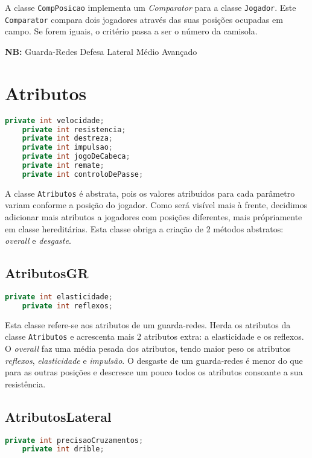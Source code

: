 \documentclass[a4paper]{report}
\begin{document}
    A classe \texttt{CompPosicao} implementa um \textit{Comparator} para a classe \texttt{Jogador}.
    Este \texttt{Comparator} compara dois jogadores através das suas posições ocupadas em campo. Se forem iguais, o critério passa a ser o número da camisola. \par 
    \textbf{NB:} Guarda-Redes \rightarrow Defesa \rightarrow Lateral \rightarrow Médio 
    \rightarrow Avançado 
    
	\section{Atributos}
	\begin{lstlisting}[language=Java]
    private int velocidade;
    private int resistencia;
    private int destreza;
    private int impulsao;
    private int jogoDeCabeca;
    private int remate;
    private int controloDePasse;
    \end{lstlisting}
    
    A classe \texttt{Atributos} é abstrata, pois os valores atribuídos para cada parâmetro variam conforme a posição do jogador. Como será visível mais à frente, decidimos adicionar mais atributos 
    a jogadores com posições diferentes, mais própriamente em classe hereditárias. Esta classe obriga a criação de 2 métodos abstratos: \textit{overall} e \textit{desgaste}.
	
	\subsection{AtributosGR}
	\begin{lstlisting}[language=Java]
    private int elasticidade;
    private int reflexos;
    \end{lstlisting}
    
    Esta classe refere-se aos atributos de um guarda-redes. Herda os atributos da classe \texttt{Atributos} e acrescenta mais 2 atributos extra: a elasticidade e os reflexos.
    O \textit{overall} faz uma média pesada dos atributos, tendo maior peso os atributos \textit{reflexos}, \textit{elasticidade} e \textit{impulsão}. O desgaste de um guarda-redes é menor do que para as outras posições e descresce um pouco todos os atributos consoante a sua resistência.
    
    \subsection{AtributosLateral}
    \begin{lstlisting}[language=Java]
    private int precisaoCruzamentos;
    private int drible;
    \end{lstlisting}
\end{document}
